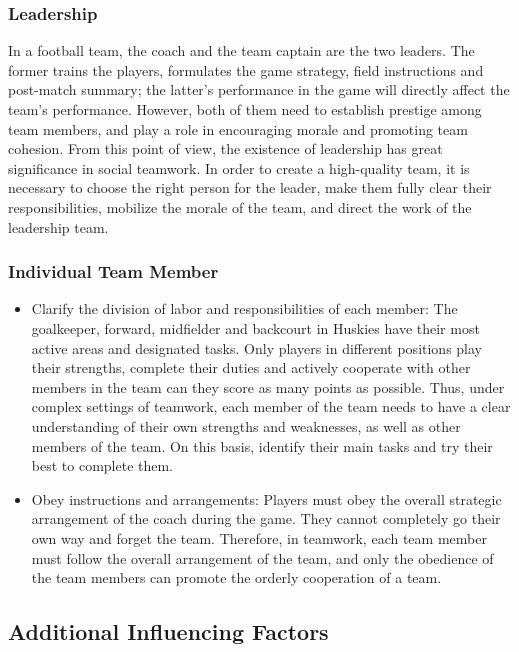 \documentclass{mcmthesis}
\begin{document}
\subsubsection{Leadership}

In a football team, the coach and the team captain are the two leaders. The former trains the players, formulates the game strategy, field instructions and post-match summary; the latter's performance in the game will directly affect the team's performance. However, both of them need to establish prestige among team members, and play a role in encouraging morale and promoting team cohesion. From this point of view, the existence of leadership has great significance in social teamwork. In order to create a high-quality team, it is necessary to choose the right person for the leader, make them fully clear their responsibilities, mobilize the morale of the team, and direct the work of the leadership team.

\subsubsection{Individual Team Member}
\begin{itemize}
    \item Clarify the division of labor and responsibilities of each member: The goalkeeper, forward, midfielder and backcourt in Huskies have their most active areas and designated tasks. Only players in different positions play their strengths, complete their duties and actively cooperate with other members in the team can they score as many points as possible. Thus, under complex settings of teamwork, each member of the team needs to have a clear understanding of their own strengths and weaknesses, as well as other members of the team. On this basis, identify their main tasks and try their best to complete them.
    \item Obey instructions and arrangements: Players must obey the overall strategic arrangement of the coach during the game. They cannot completely go their own way and forget the team. Therefore, in teamwork, each team member must follow the overall arrangement of the team, and only the obedience of the team members can promote the orderly cooperation of a team.
\end{itemize}
\subsection{Additional Influencing Factors}
\end{document}
